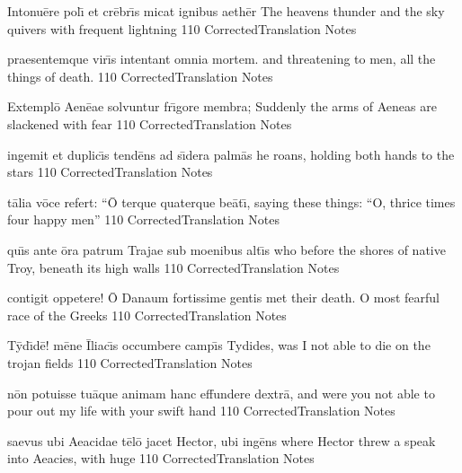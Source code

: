 \documentclass[]{book}
\begin{document}
	\latline
	  {Intonu\={\macron e}re pol\={\macron \i} et cr\={\macron e}br\={\macron \i}s micat ignibus aeth\={\macron e}r}
	  { The heavens thunder and the sky quivers with frequent lightning }
	  {110}
	  { CorrectedTranslation }
	  { Notes }


	\latline
	  {praesentemque vir\={\macron \i}s intentant omnia mortem.}
	  { and threatening to men, all the things of death. }
	  {110}
	  { CorrectedTranslation }
	  { Notes }


	\newpage

	\latline
	  {Extempl\={\macron o} Aen\={\macron e}ae solvuntur fr\={\macron \i}gore membra;}
	  { Suddenly the arms of Aeneas are slackened with fear }
	  {110}
	  { CorrectedTranslation }
	  { Notes }


	\latline
	  {ingemit et duplic\={\macron \i}s tend\={\macron e}ns ad s\={\macron \i}dera palm\={\macron a}s}
	  { he roans, holding both hands to the stars }
	  {110}
	  { CorrectedTranslation }
	  { Notes }


	\latline
	  {t\={\macron a}lia v\={\macron o}ce refert:  ``\={\macron O} terque quaterque be\={\macron a}t\={\macron \i},}
	  { saying these things:  ``O, thrice times four happy men'' }
	  {110}
	  { CorrectedTranslation }
	  { Notes }


	\newpage

	\latline
	  {qu\={\macron \i}s ante \={\macron o}ra patrum Trajae sub moenibus alt\={\macron \i}s}
	  { who before the shores of native Troy, beneath its high walls }
	  {110}
	  { CorrectedTranslation }
	  { Notes }


	\latline
	  {contigit oppetere!  \={\macron O} Danaum fortissime gentis}
	  { met their death.  O most fearful race of the Greeks }
	  {110}
	  { CorrectedTranslation }
	  { Notes }


	\latline
	  {T\={\macron y}d\={\macron \i}d\={\macron e}!  m\={\macron e}ne \={\macron I}liac\={\macron \i}s occumbere camp\={\macron \i}s}
	  { Tydides, was I not able to die on the trojan fields }
	  {110}
	  { CorrectedTranslation }
	  { Notes }


	\newpage

	\latline
	  {n\={\macron o}n potuisse tu\={\macron a}que animam hanc effundere dextr\={\macron a},}
	  { and were you not able to pour out my life with your swift hand }
	  {110}
	  { CorrectedTranslation }
	  { Notes }


	\latline
	  {saevus ubi Aeacidae t\={\macron e}l\={\macron o} jacet Hector, ubi ing\={\macron e}ns}
	  { where Hector threw a speak into Aeacies, with huge }
	  {110}
	  { CorrectedTranslation }
	  { Notes }
\end{document}
